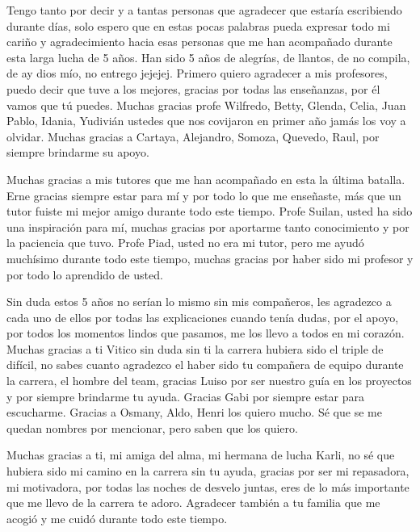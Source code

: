 \begin{acknowledgements}
    
    Tengo tanto por decir y a tantas personas que agradecer que estaría escribiendo durante días, solo espero que en estas pocas palabras pueda expresar todo mi cariño 
    y agradecimiento hacia esas personas que me han acompañado durante esta larga lucha de 5 años. Han sido 5 años de alegrías, de llantos, de no compila, de ay dios 
    mío, no entrego jejejej.
    Primero quiero agradecer a mis profesores, puedo decir que tuve a los mejores, gracias por todas las enseñanzas, por él vamos que tú puedes. Muchas gracias 
    profe Wilfredo, Betty, Glenda, Celia, Juan Pablo, Idania, Yudivián ustedes que nos covijaron en primer año jamás los voy a olvidar.
    Muchas gracias a Cartaya, Alejandro, Somoza, Quevedo, Raul, por siempre brindarme su apoyo.
    
    Muchas gracias a mis tutores que me han acompañado en esta la última batalla. Erne gracias siempre estar para mí y por todo lo que me enseñaste, más que un tutor fuiste mi mejor amigo durante todo este tiempo.
    Profe Suilan, usted ha sido una inspiración para mí, muchas gracias por aportarme tanto conocimiento y por la paciencia que tuvo.
    Profe Piad, usted no era mi tutor, pero me ayudó muchísimo durante todo este tiempo, muchas gracias por haber sido mi profesor y por todo lo aprendido de usted.
    
    Sin duda estos 5 años no serían lo mismo sin mis compañeros, les agradezco a cada uno de ellos por todas las explicaciones cuando tenía dudas, por el apoyo, por todos los momentos lindos que pasamos, me los llevo a todos en mi corazón.
    Muchas gracias a ti Vitico sin duda sin ti la carrera hubiera sido el triple de difícil, no sabes cuanto agradezco el haber sido tu compañera de equipo durante la carrera, el hombre del team,
    gracias Luiso por ser nuestro guía en los proyectos y por siempre brindarme tu ayuda.
    Gracias Gabi por siempre estar para escucharme.
    Gracias a Osmany, Aldo, Henri los quiero mucho.
    Sé que se me quedan nombres por mencionar, pero saben que los quiero.
    
    Muchas gracias a ti, mi amiga del alma, mi hermana de lucha Karli, no sé que hubiera sido mi camino en la carrera sin tu ayuda, 
    gracias por ser mi repasadora, mi motivadora, por todas las noches de desvelo juntas, eres de lo más importante que me llevo 
    de la carrera te adoro. Agradecer también a tu familia que me acogió y me cuidó durante todo este tiempo.
    

\end{acknowledgements}
